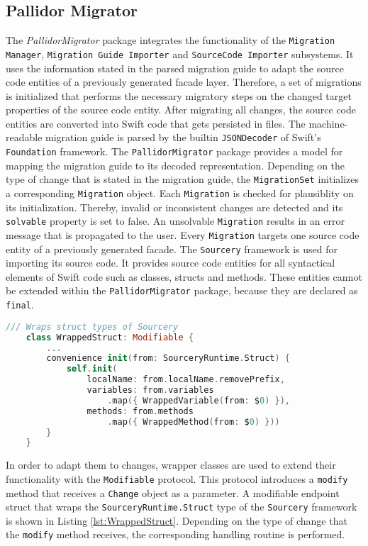\subsection{Pallidor Migrator}\label{subsec:PallidorMigrator}

The \textit{PallidorMigrator} package integrates the functionality of the \texttt{Migration} \texttt{Ma\-nager}, \texttt{Migration Guide Importer} and \texttt{SourceCode Importer} subsystems. It uses the information stated in the parsed migration guide to adapt the source code entities of a previously generated facade layer. Therefore, a set of migrations is initialized that performs the necessary migratory steps on the changed target properties of the source code entity. After migrating all changes, the source code entities are converted into Swift code that gets persisted in files. The machine-readable migration guide is parsed by the builtin \texttt{JSONDecoder} of Swift's \texttt{Foundation} framework. The \texttt{PallidorMigrator} package provides a model for mapping the migration guide to its decoded representation. Depending on the type of change that is stated in the migration guide, the \texttt{MigrationSet} initializes a corresponding \texttt{Migration} object. Each \texttt{Migration} is checked for plausiblity on its initialization. Thereby, invalid or inconsistent changes are detected and its \texttt{solvable} property is set to false. An unsolvable \texttt{Migration} results in an error message that is propagated to the user. Every \texttt{Migration} targets one source code entity of a previously generated facade. The \texttt{Sourcery} framework is used for importing its source code. It provides source code entities for all syntactical elements of Swift code such as classes, structs and methods. These entities cannot be extended within the \texttt{PallidorMigrator} package, because they are declared as \texttt{final}.

\begin{lstlisting}[language=Swift, caption={Extending a wrapped Sourcery struct}, captionpos=b, label={lst:WrappedStruct}]
	/// Wraps struct types of Sourcery
	class WrappedStruct: Modifiable {
		...
		convenience init(from: SourceryRuntime.Struct) {
			self.init(
				localName: from.localName.removePrefix, 
				variables: from.variables
					.map({ WrappedVariable(from: $0) }), 
				methods: from.methods
					.map({ WrappedMethod(from: $0) }))
		}
	}
\end{lstlisting}

In order to adapt them to changes, wrapper classes are used to extend their functionality with the \texttt{Modifiable} protocol. This protocol introduces a \texttt{modify} method that receives a \texttt{Change} object as a parameter. A modifiable endpoint struct that wraps the \texttt{SourceryRuntime.\-Struct} type of the \texttt{Sourcery} framework is shown in Listing \ref{lst:WrappedStruct}. Depending on the type of change that the \texttt{modify} method receives, the corresponding handling routine is performed. 

